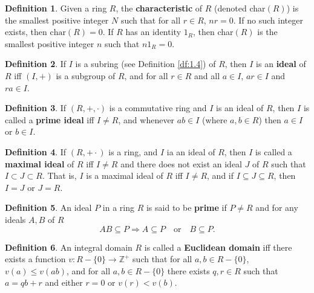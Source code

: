 \documentclass{article}
\theoremstyle{definition}
\newtheorem{definition}{Definition}[section]
\theoremstyle{remark}
\theoremstyle{definition}
\begin{document}
    \begin{definition}\label{df:1.7}
        Given a ring $R$, the \textbf{characteristic} of $R$ (denoted char$(R)$) is the smallest positive integer $N$ such that for all $r\in R$, $nr=0$. If no such integer exists, then $\text{char}(R)=0$. If $R$ has an identity $1_R$, then char$(R)$ is the smallest positive integer $n$ such that $n1_R=0$.
    \end{definition}
    
    \begin{definition}\label{df:1.8}
        If $I$ is a subring (see Definition \ref{df:1.4}) of $R$, then $I$ is an \textbf{ideal} of $R$ iff $(I,+)$ is a subgroup of $R$, and for all $r\in R$ and all $a\in I$, $ar\in I$ and $ra\in I$.
    \end{definition}
    
    \begin{definition}\label{df:1.9}
        If $(R,+,\cdot)$ is a commutative ring and $I$ is an ideal of $R$, then $I$ is called a \textbf{prime ideal} iff $I\neq R$, and whenever $ab\in I$ (where $a,b\in R$) then $a\in I$ or $b\in I$.
    \end{definition}
    
    \begin{definition}\label{df:1.10}
        If $(R,+\cdot)$ is a ring, and $I$ ia an ideal of $R$, then $I$ is called a \textbf{maximal ideal} of $R$ iff $I\neq R$ and there does not exist an ideal $J$ of $R$ such that $I\subset J\subset R$. That is, $I$ is a maximal ideal of $R$ iff $I\neq R$, and if $I\subseteq J\subseteq R$, then $I=J$ or $J=R$.
    \end{definition}
    
    \begin{definition}\label{df:1.11}
        An ideal $P$ in a ring $R$ is said to be \textbf{prime} if $P\neq R$ and for any ideals $A,B$ of $R$
            \begin{equation*}
                AB\subseteq P\Rightarrow A\subseteq P\quad\text{or}\quad B\subseteq P.
            \end{equation*}
    \end{definition}
    
    \begin{definition}\label{df:1.12}
        An integral domain $R$ is called a \textbf{Euclidean domain} iff there exists a function $v\colon R-\{0\}\rightarrow\mathbb{Z}^{+}$ such that for all $a,b\in R-\{0\}$, $v(a)\leq v(ab)$, and for all $a,b\in R-\{0\}$ there exists $q,r\in R$ such that $a=qb+r$ and either $r=0$ or $v(r)<v(b)$.
    \end{definition}
    
\end{document}
